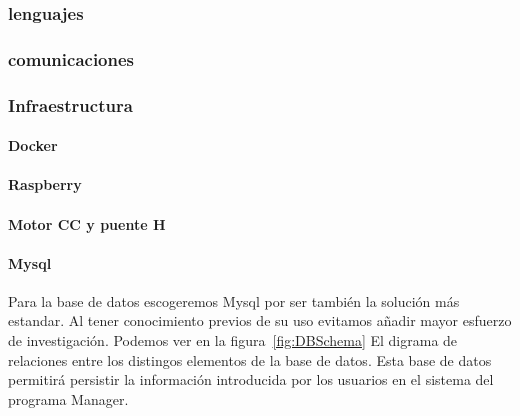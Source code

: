 \subsubsection{lenguajes}
    
\subsubsection{comunicaciones}\label{subsubsec:communications}
    
\subsubsection{Infraestructura}\label{subsubsec:infraestructura}
\paragraph{Docker}\label{par:Docker}
    
\paragraph{Raspberry}
    
\paragraph{Motor CC y puente H}
    
    
\paragraph{Mysql}\label{par:mysql}
    Para la base de datos escogeremos Mysql por ser también la solución más estandar. Al tener conocimiento previos de su uso evitamos añadir mayor esfuerzo de investigación. Podemos ver en la figura~\cref{fig:DBSchema} El digrama de relaciones entre los distingos elementos de la base de datos. Esta base de datos permitirá persistir la información introducida por los usuarios en el sistema del programa Manager.\\

